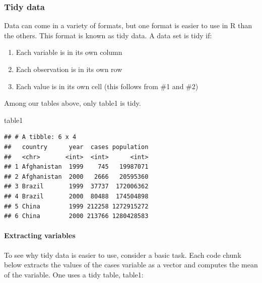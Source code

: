 \documentclass[
]{article}
\newenvironment{Shaded}{\begin{snugshade}}{\end{snugshade}}
\newcommand{\FunctionTok}[1]{\textcolor[rgb]{0.00,0.00,0.00}{#1}}
\newcommand{\NormalTok}[1]{#1}
\newcommand{\SpecialCharTok}[1]{\textcolor[rgb]{0.00,0.00,0.00}{#1}}
\providecommand{\tightlist}{%
  \setlength{\itemsep}{0pt}\setlength{\parskip}{0pt}}
\begin{document}
\hypertarget{tidy-data-1}{%
\subsubsection{Tidy data}\label{tidy-data-1}}

Data can come in a variety of formats, but one format is easier to use
in R than the others. This format is known as tidy data. A data set is
tidy if:

\begin{enumerate}
\def\labelenumi{\arabic{enumi}.}
\tightlist
\item
  Each variable is in its own column
\item
  Each observation is in its own row
\item
  Each value is in its own cell (this follows from \#1 and \#2)
\end{enumerate}

Among our tables above, only table1 is tidy.

\begin{Shaded}
\begin{Highlighting}[]
\NormalTok{table1}
\end{Highlighting}
\end{Shaded}

\begin{verbatim}
## # A tibble: 6 x 4
##   country      year  cases population
##   <chr>       <int>  <int>      <int>
## 1 Afghanistan  1999    745   19987071
## 2 Afghanistan  2000   2666   20595360
## 3 Brazil       1999  37737  172006362
## 4 Brazil       2000  80488  174504898
## 5 China        1999 212258 1272915272
## 6 China        2000 213766 1280428583
\end{verbatim}

\hypertarget{extracting-variables}{%
\paragraph{Extracting variables}\label{extracting-variables}}

To see why tidy data is easier to use, consider a basic task. Each code
chunk below extracts the values of the cases variable as a vector and
computes the mean of the variable. One uses a tidy table, table1:

\begin{Shaded}
\end{Shaded}
\end{document}
